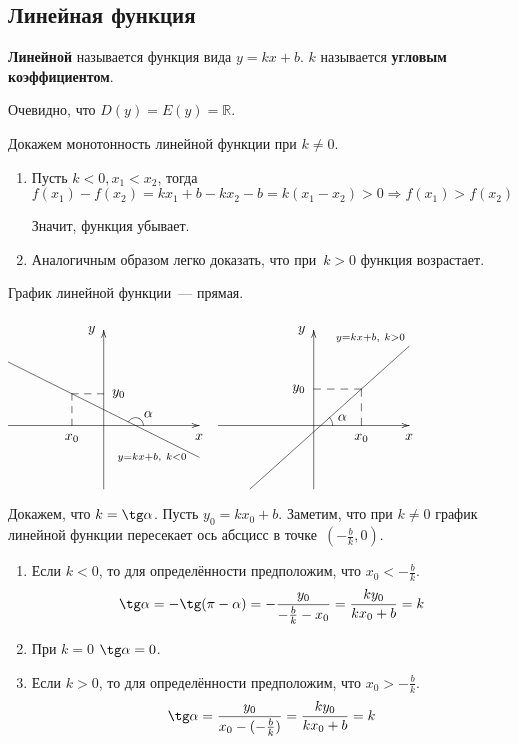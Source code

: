 \subsection{Линейная функция}
 \textbf{Линейной} называется функция вида $y = kx + b$.
$k$ называется \textbf{угловым коэффициентом}.

Очевидно, что $D(y) = E(y) = \mathbb R$.

Докажем монотонность линейной функции при $k \neq 0$.
\begin{enumerate}
	\item Пусть $k < 0, x_1 < x_2$, тогда
	\begin{equation*}
	f(x_1) - f(x_2) =
	k x_1 + b - k x_2 - b =
	k(x_1 - x_2) > 0 \Rightarrow
	f(x_1) > f(x_2)
	\end{equation*}
	
	Значит, функция убывает.
	
	\item Аналогичным образом легко доказать, что при~$k > 0$ функция возрастает.
\end{enumerate}

График линейной функции~--- прямая.
\begin{center}
$\begin{xy} /r8mm/:
(-3, 0); (3, 0) **@{-} *@{>} *++!U{x};
(0, -2); (0, 3) **@{-} *@{>} *++!R{y};
(-3, 2); (3, -1) **@{-} *+++!R{\scriptstyle y = kx + b, \ k < 0};
{(1, 0) \ellipse<2mm>:a(90),_,:a(-63.435){}} *++!LD{\alpha};
(-1, 1) = "M"; (-1, 0) **@{--} *++!U{x_0};
"M"; (0, 1) **@{--} *++!L{y_0};
\end{xy}$
$\begin{xy} /r8mm/:
(-3, 0); (3, 0) **@{-} *@{>} *++!U{x};
(0, -2); (0, 3) **@{-} *@{>} *++!R{y};
(-2, -2); (3, 2.5) **@{-} *+!DR{\scriptstyle y = kx + b, \ k > 0};
{(0.222, 0) \ellipse<3mm>:a(48.013),^,:a(90){}};
(0.9, 0.25) *{\alpha};
(1.5, 1.15) = "M"; (1.5, 0) **@{--} *++!U{x_0};
"M"; (0, 1.15) **@{--} *++!R{y_0};
\end{xy}$
\end{center}

Докажем, что $k = \tg \alpha$.
Пусть $y_0 = k x_0 + b$.
Заметим, что при $k \neq 0$ график линейной функции пересекает ось абсцисс в точке~$(-\frac{b}k, 0)$.
\begin{enumerate}
	\item Если $k < 0$, то для определённости предположим, что $x_0 < -\frac{b}k$.
	\begin{equation*}
	\tg \alpha =
	-\tg (\pi - \alpha) =
	-\frac{y_0}{-\frac{b}k - x_0} =
	\frac{k y_0}{k x_0 + b} =
	k
	\end{equation*}
	
	\item При $k = 0$ $\tg \alpha = 0$.
	
	\item Если $k > 0$, то для определённости предположим, что $x_0 > -\frac{b}k$.
	\begin{equation*}
	\tg \alpha =
	\frac{y_0}{x_0 - (-\frac{b}k)} =
	\frac{k y_0}{k x_0 + b} =
	k
	\end{equation*}
\end{enumerate}
